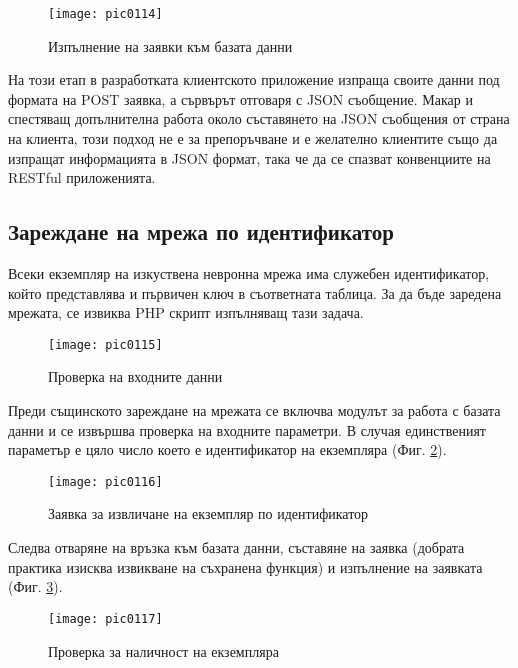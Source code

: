 \begin{figure}[h]
  \centering
  \texttt{[image: pic0114]}
  \caption{Изпълнение на заявки към базата данни}
\label{fig:pic0114}
\end{figure}
\FloatBarrier

На този етап в разработката клиентското приложение изпраща своите данни под формата на POST заявка, а сървърът отговаря с JSON съобщение. Макар и спестяващ допълнителна работа около съставянето на JSON съобщения от страна на клиента, този подход не е за препоръчване и е желателно клиентите също да изпращат информацията в JSON формат, така че да се спазват конвенциите на RESTful приложенията. 

\subsection{Зареждане на мрежа по идентификатор}

Всеки екземпляр на изкуствена невронна мрежа има служебен идентификатор, който представлява и първичен ключ в съответната таблица. За да бъде заредена мрежата, се извиква PHP скрипт изпълняващ тази задача. 

\begin{figure}[h]
  \centering
  \texttt{[image: pic0115]}
  \caption{Проверка на входните данни}
\label{fig:pic0115}
\end{figure}
\FloatBarrier

Преди същинското зареждане на мрежата се включва модулът за работа с базата данни и се извършва проверка на входните параметри. В случая единственият параметър е цяло число което е идентификатор на екземпляра (Фиг. \ref{fig:pic0115}).

\begin{figure}[h]
  \centering
  \texttt{[image: pic0116]}
  \caption{Заявка за извличане на екземпляр по идентификатор}
\label{fig:pic0116}
\end{figure}
\FloatBarrier

Следва отваряне на връзка към базата данни, съставяне на заявка (добрата практика изисква извикване на съхранена функция) и изпълнение на заявката (Фиг. \ref{fig:pic0116}). 

\begin{figure}[h]
  \centering
  \texttt{[image: pic0117]}
  \caption{Проверка за наличност на екземпляра}
\label{fig:pic0117}
\end{figure}
\FloatBarrier

